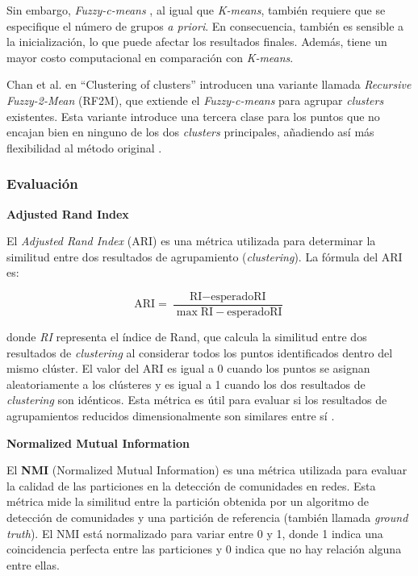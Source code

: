 \documentclass[11pt,a4paper,twoside,openany]{tesis}
\begin{document}
Sin embargo, \emph{Fuzzy-c-means} , al igual que \emph{K-means},  también requiere que se especifique el número de grupos \emph{a priori}. En consecuencia, también es sensible a la inicialización, lo que puede afectar los resultados finales. Además, tiene un mayor costo computacional en comparación con \emph{K-means}.

Chan et al. en ``Clustering of clusters'' introducen una variante llamada \emph{Recursive Fuzzy-2-Mean} (RF2M), que extiende el \emph{Fuzzy-c-means} para agrupar \emph{clusters} existentes. Esta variante introduce una tercera clase para los puntos que no encajan bien en ninguno de los dos \emph{clusters} principales, añadiendo así más flexibilidad al método original \cite{fuzzy-k-means}.


\subsubsection{Evaluación} \textbf{ }

\textbf{Adjusted Rand Index}

El \textit{Adjusted Rand Index} (ARI) es una métrica utilizada para determinar la similitud entre dos resultados de agrupamiento (\emph{clustering}). La fórmula del ARI es:

\begin{equation}
\text{ARI} = \frac{\text{RI} - \text{esperadoRI}}{\max \text{RI} - \text{esperadoRI}}
\end{equation}

donde \textit{RI} representa el índice de Rand, que calcula la similitud entre dos resultados de \emph{clustering} al considerar todos los puntos identificados dentro del mismo clúster. El valor del ARI es igual a 0 cuando los puntos se asignan aleatoriamente a los clústeres y es igual a 1 cuando los dos resultados de \emph{clustering} son idénticos. Esta métrica es útil para evaluar si los resultados de agrupamientos reducidos dimensionalmente son similares entre sí \cite{ari}.

\textbf{Normalized Mutual Information}

El \textbf{NMI} (Normalized Mutual Information) es una métrica utilizada para evaluar la calidad de las particiones en la detección de comunidades en redes. Esta métrica mide la similitud entre la partición obtenida por un algoritmo de detección de comunidades y una partición de referencia (también llamada \emph{ground truth}). El NMI está normalizado para variar entre 0 y 1, donde 1 indica una coincidencia perfecta entre las particiones y 0 indica que no hay relación alguna entre ellas.
\end{document}
